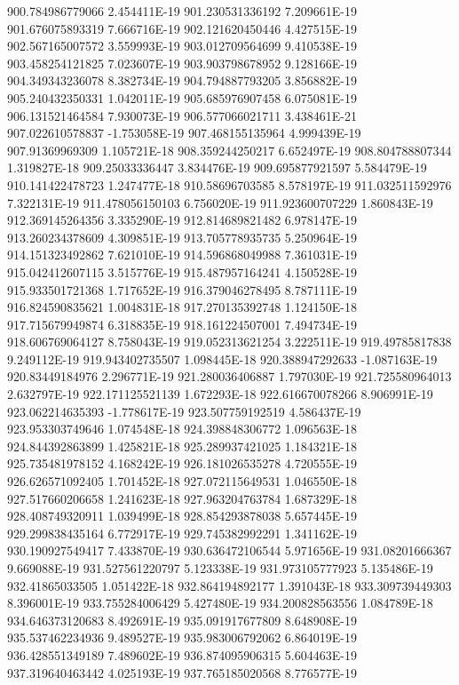900.784986779066  2.454411E-19
901.230531336192  7.209661E-19
901.676075893319  7.666716E-19
902.121620450446  4.427515E-19
902.567165007572  3.559993E-19
903.012709564699  9.410538E-19
903.458254121825  7.023607E-19
903.903798678952  9.128166E-19
904.349343236078  8.382734E-19
904.794887793205  3.856882E-19
905.240432350331  1.042011E-19
905.685976907458  6.075081E-19
906.131521464584  7.930073E-19
906.577066021711  3.438461E-21
907.022610578837  -1.753058E-19
907.468155135964  4.999439E-19
907.91369969309  1.105721E-18
908.359244250217  6.652497E-19
908.804788807344  1.319827E-18
909.25033336447  3.834476E-19
909.695877921597  5.584479E-19
910.141422478723  1.247477E-18
910.58696703585  8.578197E-19
911.032511592976  7.322131E-19
911.478056150103  6.756020E-19
911.923600707229  1.860843E-19
912.369145264356  3.335290E-19
912.814689821482  6.978147E-19
913.260234378609  4.309851E-19
913.705778935735  5.250964E-19
914.151323492862  7.621010E-19
914.596868049988  7.361031E-19
915.042412607115  3.515776E-19
915.487957164241  4.150528E-19
915.933501721368  1.717652E-19
916.379046278495  8.787111E-19
916.824590835621  1.004831E-18
917.270135392748  1.124150E-18
917.715679949874  6.318835E-19
918.161224507001  7.494734E-19
918.606769064127  8.758043E-19
919.052313621254  3.222511E-19
919.49785817838  9.249112E-19
919.943402735507  1.098445E-18
920.388947292633  -1.087163E-19
920.83449184976  2.296771E-19
921.280036406887  1.797030E-19
921.725580964013  2.632797E-19
922.171125521139  1.672293E-18
922.616670078266  8.906991E-19
923.062214635393  -1.778617E-19
923.507759192519  4.586437E-19
923.953303749646  1.074548E-18
924.398848306772  1.096563E-18
924.844392863899  1.425821E-18
925.289937421025  1.184321E-18
925.735481978152  4.168242E-19
926.181026535278  4.720555E-19
926.626571092405  1.701452E-18
927.072115649531  1.046550E-18
927.517660206658  1.241623E-18
927.963204763784  1.687329E-18
928.408749320911  1.039499E-18
928.854293878038  5.657445E-19
929.299838435164  6.772917E-19
929.745382992291  1.341162E-19
930.190927549417  7.433870E-19
930.636472106544  5.971656E-19
931.08201666367  9.669088E-19
931.527561220797  5.123338E-19
931.973105777923  5.135486E-19
932.41865033505  1.051422E-18
932.864194892177  1.391043E-18
933.309739449303  8.396001E-19
933.755284006429  5.427480E-19
934.200828563556  1.084789E-18
934.646373120683  8.492691E-19
935.091917677809  8.648908E-19
935.537462234936  9.489527E-19
935.983006792062  6.864019E-19
936.428551349189  7.489602E-19
936.874095906315  5.604463E-19
937.319640463442  4.025193E-19
937.765185020568  8.776577E-19
